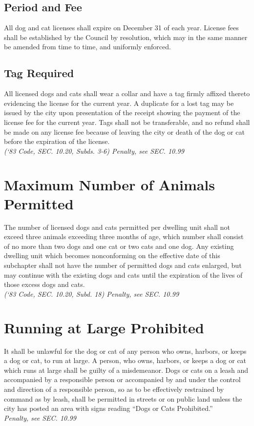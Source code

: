 \subsection{Period and Fee}
All dog and cat licenses shall expire on December 31 of each year.  License fees shall be established by the Council by resolution, which may in the same manner be amended from time to time, and uniformly enforced.
\subsection{Tag Required}
All licensed dogs and cats shall wear a collar and have a tag firmly affixed thereto evidencing the license for the current year.  A duplicate for a lost tag may be issued by the city upon presentation of the receipt showing the payment of the license fee for the current year.  Tags shall not be transferable, and no refund shall be made on any license fee because of leaving the city or death of the dog or cat before the expiration of the license.\\
\emph{(‘83 Code, SEC. 10.20, Subds. 3-6)  Penalty, see SEC. 10.99}

\section{Maximum Number of Animals Permitted}
The number of licensed dogs and cats permitted per dwelling unit shall not exceed three animals exceeding three months of age, which number shall consist of no more than two dogs and one cat or two cats and one dog. Any existing dwelling unit which becomes nonconforming on the effective date of this subchapter shall not have the number of permitted dogs and cats enlarged, but may continue with the existing dogs and cats until the expiration of the lives of those excess dogs and cats.\\
\emph{(‘83 Code, SEC. 10.20, Subd. 18)  Penalty, see SEC. 10.99}

\section{Running at Large Prohibited}
It shall be unlawful for the dog or cat of any person who owns, harbors, or keeps a dog or cat, to run at large.  A person, who owns, harbors, or keeps a dog or cat which runs at large shall be guilty of a misdemeanor.  Dogs or cats on a leash and accompanied by a responsible person or accompanied by and under the control and direction of a responsible person, so as to be effectively restrained by command as by leash, shall be permitted in streets or on public land unless the city has posted an area with signs reading “Dogs or Cats Prohibited.”\\
\emph{Penalty, see SEC. 10.99}

